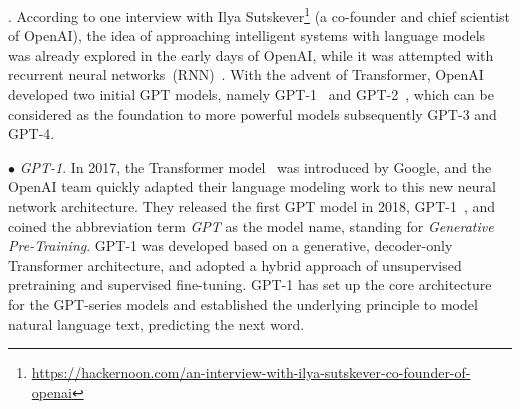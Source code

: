 . According to one interview with Ilya Sutskever\footnote{\url{https://hackernoon.com/an-interview-with-ilya-sutskever-co-founder-of-openai}} (a co-founder and chief scientist of OpenAI), the idea of approaching   intelligent systems  with language models was already explored in the early days of OpenAI, while it was attempted with recurrent neural networks~(RNN)~\cite{Radford-CoRR-2017-Learning}. With the advent of Transformer, OpenAI developed two initial GPT models, namely GPT-1~\cite{radford-openai-2018-improving} and GPT-2~\cite{radford-blog-2019-language}, which can be considered as the foundation to  more powerful models subsequently \ie GPT-3 and GPT-4.   

$\bullet$ \emph{GPT-1}. In 2017, the Transformer model~\cite{Vaswani-NIPS-2017-Attention} was introduced by Google, and the OpenAI team quickly adapted their language modeling work to this new neural network architecture. They released the first GPT model in 2018, \ie GPT-1~\cite{radford-openai-2018-improving}, and coined the abbreviation term \emph{GPT} as the model name,  standing for \emph{Generative Pre-Training}. GPT-1 was developed based on a generative, decoder-only Transformer architecture, and adopted a hybrid  approach of  unsupervised pretraining and supervised fine-tuning. 
GPT-1 has set up the core architecture for the GPT-series models and established the underlying principle to model natural language text, \ie predicting the next word.  

